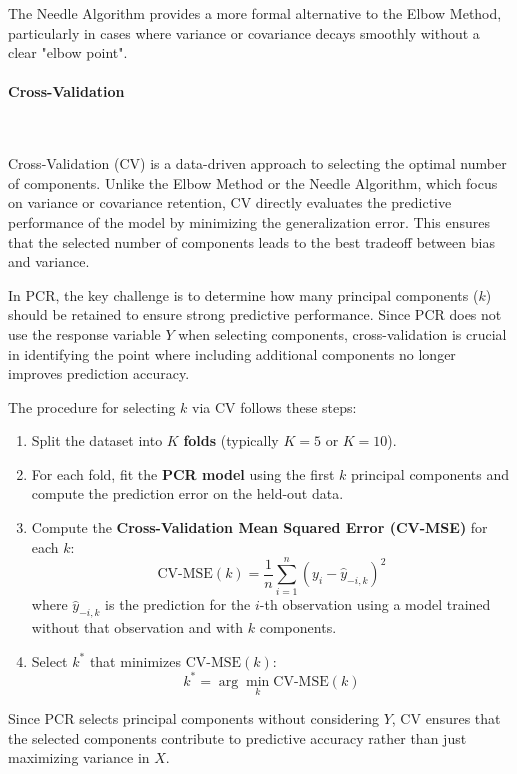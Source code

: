 \documentclass[11pt,twoside,a4paper]{article}
\begin{document}
The Needle Algorithm provides a more formal alternative to the Elbow Method, particularly in cases where variance or covariance decays smoothly without a clear "elbow point".

\paragraph {Cross-Validation} \ \

Cross-Validation (CV) is a data-driven approach to selecting the optimal number of components. Unlike the Elbow Method or the Needle Algorithm, which focus on variance or covariance retention, CV directly evaluates the predictive performance of the model by minimizing the generalization error. This ensures that the selected number of components leads to the best tradeoff between bias and variance.

In PCR, the key challenge is to determine how many principal components (\( k \)) should be retained to ensure strong predictive performance. Since PCR does not use the response variable \( Y \) when selecting components, cross-validation is crucial in identifying the point where including additional components no longer improves prediction accuracy.

The procedure for selecting \( k \) via CV follows these steps:
\begin{enumerate}
    \item Split the dataset into \( K \) \textbf{folds} (typically \( K = 5 \) or \( K = 10 \)).
    \item For each fold, fit the \textbf{PCR model} using the first \( k \) principal components and compute the prediction error on the held-out data.
    \item Compute the \textbf{Cross-Validation Mean Squared Error (CV-MSE)} for each \( k \):
    \begin{equation}
    \text{CV-MSE}(k) = \frac{1}{n} \sum_{i=1}^{n} (y_i - \hat{y}_{-i,k})^2
    \end{equation}
    where \( \hat{y}_{-i,k} \) is the prediction for the \( i \)-th observation using a model trained without that observation and with \( k \) components.
    \item Select \( k^* \) that minimizes \(\text{CV-MSE}(k)\):
    \begin{equation}
    k^* = \arg\min_k \text{CV-MSE}(k)
    \end{equation}
\end{enumerate}

Since PCR selects principal components without considering \( Y \), CV ensures that the selected components contribute to predictive accuracy rather than just maximizing variance in \( X \).
\end{document}
